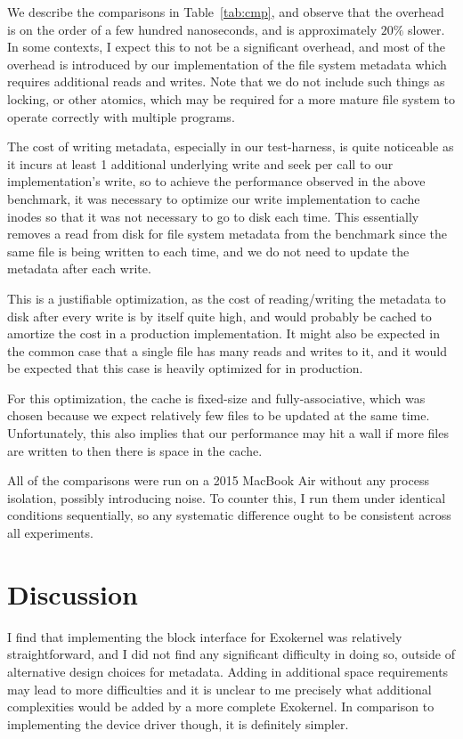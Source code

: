 \documentclass[letterpaper,twocolumn,10pt]{article}
\begin{document}
We describe the comparisons in Table~\ref{tab:cmp}, and observe that the overhead is on the
order of a few hundred nanoseconds, and is approximately $20\%$ slower. In some contexts, I
expect this to not be a significant overhead, and most of the overhead is introduced by our
implementation of the file system metadata which requires additional reads and writes. Note that
we do not include such things as locking, or other atomics, which may be required for a more
mature file system to operate correctly with multiple programs.

The cost of writing metadata, especially in our test-harness, is quite noticeable as it incurs
at least 1 additional underlying write and seek per call to our implementation's write, so to
achieve the performance observed in the above benchmark, it was necessary to optimize our write
implementation to cache inodes so that it was not necessary to go to disk each time. This
essentially removes a read from disk for file system metadata from the benchmark since the same
file is being written to each time, and we do not need to update the metadata after each write.

This is a justifiable optimization, as the cost of reading/writing the metadata to disk after
every write is by itself quite high, and would probably be cached to amortize the cost in a
production implementation. It might also be expected in the common case that a single file has
many reads and writes to it, and it would be expected that this case is heavily optimized for in
production.

For this optimization, the cache is fixed-size and fully-associative, which was chosen because
we expect relatively few files to be updated at the same time. Unfortunately, this also implies
that our performance may hit a wall if more files are written to then there is space in the
cache.

All of the comparisons were run on a 2015 MacBook Air without any process isolation, possibly
introducing noise. To counter this, I run them under identical conditions sequentially, so any
systematic difference ought to be consistent across all experiments.

\section{Discussion}

I find that implementing the block interface for Exokernel was relatively straightforward, and I
did not find any significant difficulty in doing so, outside of alternative design choices for
metadata. Adding in additional space requirements may lead to more difficulties and it is
unclear to me precisely what additional complexities would be added by a more complete
Exokernel.  In comparison to implementing the device driver though, it is definitely simpler.
\end{document}
